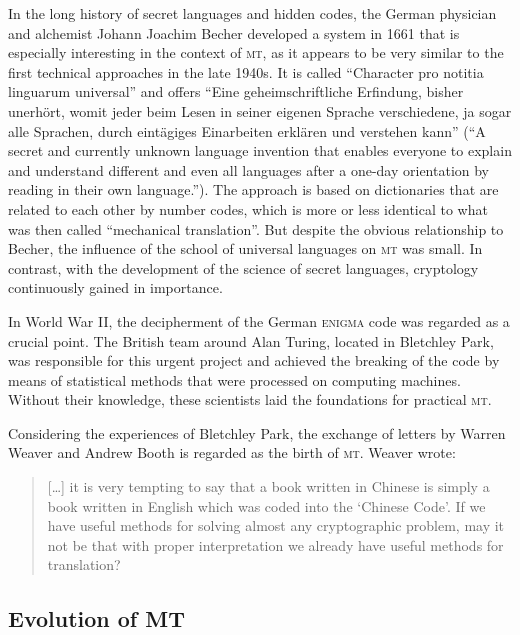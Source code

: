 \documentclass[output=paper]{LSP/langsci}
\begin{document}
In the long history of secret languages and hidden codes, the German physician and alchemist Johann Joachim Becher developed a system in 1661 that is especially interesting in the context of \textsc{mt}, as it appears to be very similar to the first technical approaches in the late 1940s. It is called ``Character pro notitia linguarum universal'' and offers ``Eine geheimschriftliche Erfindung, bisher unerhört, womit jeder beim Lesen in seiner eigenen Sprache verschiedene, ja sogar alle Sprachen, durch eintägiges Einarbeiten erklären und verstehen kann'' \citep{Becher1962} (``A secret and currently unknown language invention that enables everyone to explain and understand different and even all languages after a one-day orientation by reading in their own language.''). The approach is based on dictionaries that are related to each other by number codes, which is more or less identical to what was then called ``mechanical translation''. But despite the obvious relationship to Becher, the influence of the school of universal languages on \textsc{mt} was small. In contrast, with the development of the science of secret languages, cryptology continuously gained in importance.
 
In World War II, the decipherment of the German \textsc{enigma} code was regarded as a crucial point. The British team around Alan Turing, located in Bletchley Park, was responsible for this urgent project and achieved the breaking of the code by means of statistical methods that were processed on computing machines. Without their knowledge, these scientists laid the foundations for practical \textsc{mt}.
 
Considering the experiences of Bletchley Park, the exchange of letters by Warren Weaver and Andrew Booth is regarded as the birth of \textsc{mt}. Weaver wrote: 

\begin{quote}
[\ldots] it is very tempting to say that a book written in Chinese is simply a book written in English which was coded into the `Chinese Code'. If we have useful methods for solving almost any cryptographic problem, may it not be that with proper interpretation we already have useful methods for translation? \citep{Weaver1955}
\end{quote}

\subsection{Evolution of MT}\label{sec:stein:1.2}
 
\end{document}
